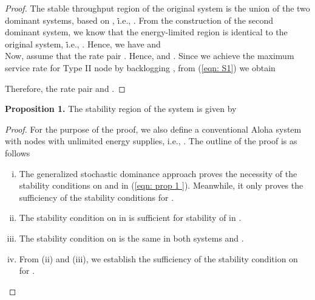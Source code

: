 \documentclass[draftcls,12pt,onecolumn]{IEEEtran}
\begin{document}
\begin{proof}
The stable throughput region of the original system is the union of the two dominant systems, based on \cite{rao1988stability}, \.i.e., . From the construction of the second dominant system, we know that the energy-limited region is identical to the original system, \.i.e., . Hence, we have  and \\ \indent Now, assume that the rate pair . Hence,  and . Since we achieve the maximum service rate for Type II node by backlogging , from (\ref{eqn: S1}) we obtain 

Therefore, the rate pair  and . 
\end{proof}
\indent \textbf{Proposition 1.} The stability region of the system  is given by 

\begin{proof}
For the purpose of the proof, we also define a conventional Aloha system with nodes with unlimited energy supplies, i.e., .
The outline of the proof is as follows \begin{enumerate}[(i)] \item The generalized stochastic dominance approach proves the necessity of the stability conditions on  and  in (\ref{eqn: prop 1 }). Meanwhile, it only proves the sufficiency of the stability conditions for .  \item The stability condition on  in  is sufficient for stability of  in . \item The stability condition on  is the same in both systems  and . \item From (ii) and (iii), we establish the sufficiency of the stability condition on  for .   \end{enumerate}


\end{proof}
\end{document}

